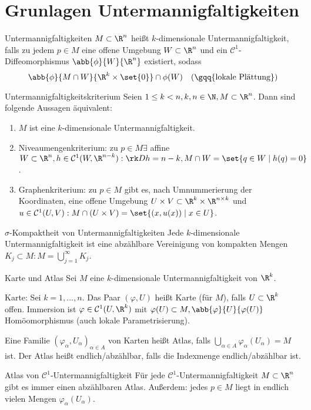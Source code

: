 \section*{Grunlagen Untermannigfaltigkeiten}

\begin{karte}{Untermannigfaltigkeiten}
    \(M\subset \R^n\) heißt \(k\)-dimensionale Untermannigfaltigkeit, 
    falls zu jedem \(p \in M\) eine offene Umgebung \(W \subset \R^n\) und 
    ein \( \mathcal{C}^1 \)-Diffeomorphismus \( \abb{\phi}{W}{\R^n} \) existiert, sodass 
    \[ \abb{\phi}{M\cap W}{\R^k \times \set{0}} \cap \phi(W) \quad \text{(\gqq{lokale Plättung})} \]
\end{karte}

\begin{karte}{Untermannigfaltigkeitskriterium}
    Seien \( 1\leq k < n, k,n\in\N, M \subset \R^n \). Dann sind folgende Aussagen 
    äquivalent:
    \begin{enumerate}
        \item \(M\) ist eine \(k\)-dimensionale Untermannigfaltigkeit.
        \item Niveaumengenkriterium: zu \(p\in M \exists \) affine \(W\subset \R^n, 
        h \in \mathcal{C}^1(W, \R^{n-k}): \rk Dh = n-k, M\cap W = \set{q\in W \;|\; h(q) = 0} \).
        \item Graphenkriterium: zu \(p\in M\) gibt es, nach Umnummerierung der 
        Koordinaten, eine offene Umgebung \( U \times V \subset \R^k \times \R^{n\times k} \)
        und \( u\in \mathcal{C}^1(U,V): M\cap (U\times V) = \set{(x,u(x)) \;|\; x\in U} \).
    \end{enumerate}
\end{karte}

\begin{karte}{\(\sigma\)-Kompaktheit von Untermannigfaltigkeiten}
    Jede \(k\)-dimensionale Untermannigfaltigkeit ist eine abzählbare 
    Vereinigung von kompakten Mengen \( K_j \subset M: M = \bigcup_{j=1}^\infty K_j \).
\end{karte}

\begin{karte}{Karte und Atlas}
    Sei \( M \) eine \(k\)-dimensionale Untermannigfaltigkeit von \(\R^k\). 
    
    Karte: Sei \( k = 1,\ldots, n \). 
    Das Paar \( (\varphi, U) \) heißt Karte (für \(M\)), falls \( U \subset \R^k \) offen.
    Immersion ist \( \varphi \in \mathcal{C}^1(U, \R^k) \) mit \( \varphi(U) \subset M, 
    \abb{\varphi}{U}{\varphi(U)} \) Homöomorphismus (auch lokale Parametrisierung).

    Eine Familie \( (\varphi_\alpha, U_\alpha)_{\alpha\in A} \) von Karten 
    heißt Atlas, falls \( \bigcup_{\alpha \in A} \varphi_\alpha(U_\alpha) = M \) ist. 
    Der Atlas heißt endlich/abzählbar, falls die Indexmenge endlich/abzählbar ist.
\end{karte}

\begin{karte}{Atlas von \(\mathcal{C}^1\)-Untermannigfaltigkeit}
    Für jede \( \mathcal{C}^1 \)-Untermannigfaltigkeit \(M\subset \R^n\) gibt es 
    immer einen abzählbaren Atlas. 
    Außerdem: jedes \( p\in M \) liegt in endlich vielen Mengen \( \varphi_\alpha(U_\alpha) \).
\end{karte}